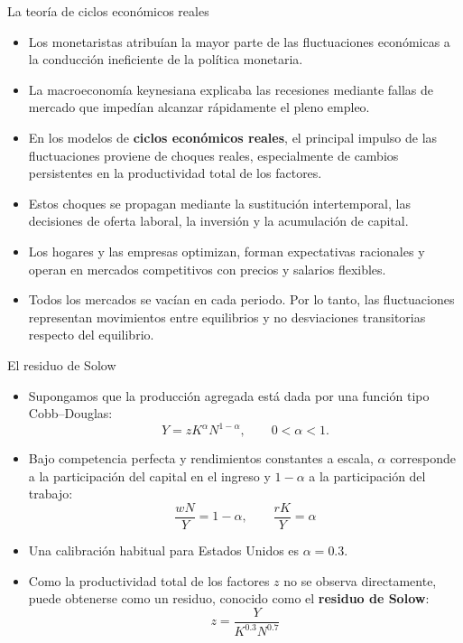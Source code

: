\documentclass[aspectratio=169,11pt]{beamer}
\newcommand{\cidehighlight}[1]{\textcolor{CIDEBlue}{\bfseries #1}}
\begin{document}
\begin{frame}{La teoría de ciclos económicos reales}
  \small

  \begin{itemize}
    \setlength{\itemsep}{0.55em}

    \item Los monetaristas atribuían la mayor parte de las fluctuaciones económicas a la conducción ineficiente de la política monetaria.

    \item La macroeconomía keynesiana explicaba las recesiones mediante fallas de mercado que impedían alcanzar rápidamente el pleno empleo.

    \item En los modelos de \cidehighlight{ciclos económicos reales}, el principal impulso de las fluctuaciones proviene de choques reales, especialmente de cambios persistentes en la productividad total de los factores.

    \item Estos choques se propagan mediante la sustitución intertemporal, las decisiones de oferta laboral, la inversión y la acumulación de capital.

    \item Los hogares y las empresas optimizan, forman expectativas racionales y operan en mercados competitivos con precios y salarios flexibles.

    \item Todos los mercados se vacían en cada periodo. Por lo tanto, las fluctuaciones representan movimientos entre equilibrios y no desviaciones transitorias respecto del equilibrio.
  \end{itemize}
\end{frame}




\begin{frame}{El residuo de Solow}
  \small
  \begin{itemize}
    \setlength{\itemsep}{0.45em}

    \item Supongamos que la producción agregada está dada por una función tipo Cobb--Douglas:
    \[
      Y=z K^{\alpha}N^{1-\alpha},
      \qquad 0<\alpha<1.
    \]

    \item Bajo competencia perfecta y rendimientos constantes a escala, \(\alpha\) corresponde a la participación del capital en el ingreso y \(1-\alpha\) a la participación del trabajo:
    $$
    \frac{wN}{Y} = 1 - \alpha, \qquad \frac{rK}{Y} = \alpha
    $$
    
    \item Una calibración habitual para Estados Unidos es \(\alpha = 0.3\).

    \item Como la productividad total de los factores \(z\) no se observa directamente, puede obtenerse como un residuo, conocido como el \cidehighlight{residuo de Solow}:
    \[
      z=\frac{Y}{K^{0.3}N^{0.7}}
    \]
  \end{itemize}

\end{frame}
\end{document}
